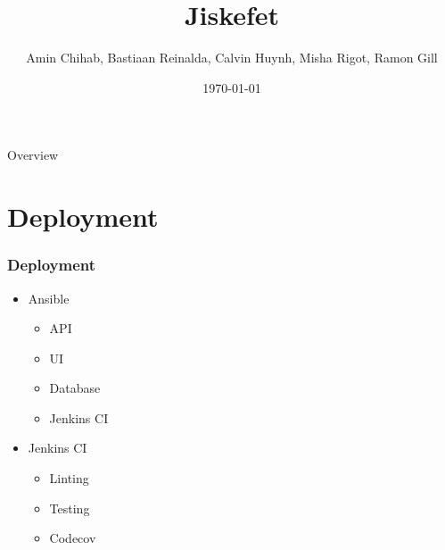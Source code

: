 \documentclass[12pt]{beamer}
\title{Jiskefet}
\author{Amin Chihab, Bastiaan Reinalda, Calvin Huynh, Misha Rigot, Ramon Gill}
\date{\today}
\begin{document}
	\begin{frame}
	\titlepage
	\end{frame}

	\begin{frame}{Overview}
		\tableofcontents
	\end{frame}

	\section{Deployment}
	\begin{frame}
        \frametitle{Deployment}
		\begin{itemize}
			\item Ansible
			\begin{itemize}
                \item API
                \item UI
                \item Database
                \item Jenkins CI
            \end{itemize} 
			\item Jenkins CI
            \begin{itemize}
                \item Linting
                \item Testing
                \item Codecov
            \end{itemize}
		\end{itemize}
    \end{frame}
\end{document}
